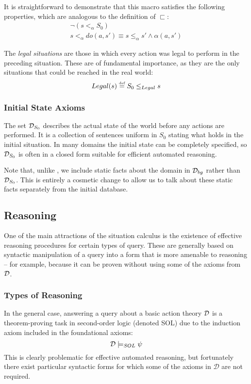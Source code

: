 It is straightforward to demonstrate that this macro satisfies the
following properties, which are analogous to the definition of $\sqsubset$:\begin{gather*}
\neg\left(s<_{\alpha}S_{0}\right)\\
s<_{\alpha}do(a,s')\equiv s\leq_{\alpha}s'\wedge\alpha(a,s')\end{gather*}


The \emph{legal situations} are those in which every action was legal
to perform in the preceding situation. These are of fundamental importance,
as they are the only situations that could be reached in the real
world:\[
Legal(s) \stackrel{\mbox{\tiny def}}{=} S_{0}\leq_{Legal}s
\]



\subsubsection{Initial State Axioms}

The set $\mathcal{D}_{S_{0}}$ describes the actual state of the world before
any actions are performed. It is a collection of sentences uniform
in $S_{0}$ stating what holds in the initial situation. In many domains
the initial state can be completely specified, so $\mathcal{D}_{S_{0}}$ is
often in a closed form suitable for efficient automated reasoning.

Note that, unlike \citep{levesque98sc_foundations,pirri99contributions_sitcalc,reiter01kia},
we include static facts about the domain in $\mathcal{D}_{bg}$ rather than
$\mathcal{D}_{S_{0}}$. This is entirely a cosmetic change to allow us to
talk about these static facts separately from the initial database.


\subsection{Reasoning}

One of the main attractions of the situation calculus is the existence
of effective reasoning procedures for certain types of query. These
are generally based on syntactic manipulation of a query into a form
that is more amenable to reasoning -- for example, because it can
be proven without using some of the axioms from $\mathcal{D}$.


\subsubsection{Types of Reasoning}

In the general case, answering a query about a basic action theory
$\mathcal{D}$ is a theorem-proving task in second-order logic (denoted SOL)
due to the induction axiom included in the foundational axioms:\[
\mathcal{D}\models_{SOL}\psi\]
 This is clearly problematic for effective automated reasoning, but
fortunately there exist particular syntactic forms for which some
of the axioms in $\mathcal{D}$ are not required.

